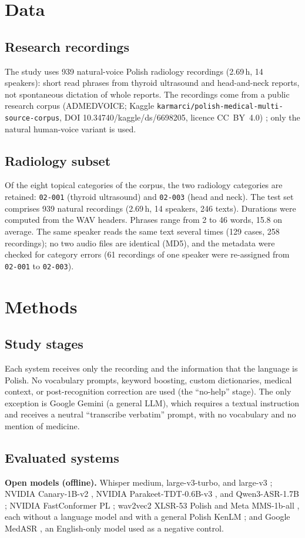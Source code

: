 \documentclass[conference]{IEEEtran}
\begin{document}
\section{Data}
\subsection{Research recordings}
The study uses 939 natural-voice Polish radiology recordings (2.69\,h, 14 speakers): short read phrases from thyroid ultrasound and head-and-neck reports, not spontaneous dictation of whole reports. The recordings come from a public research corpus (ADMEDVOICE; Kaggle \texttt{karmarci/polish-medical-multi-source-corpus}, DOI 10.34740/kaggle/ds/6698205, licence CC~BY~4.0) \cite{r1}; only the natural human-voice variant is used.

\subsection{Radiology subset}
Of the eight topical categories of the corpus, the two radiology categories are retained: \texttt{02-001} (thyroid ultrasound) and \texttt{02-003} (head and neck). The test set comprises 939 natural recordings (2.69\,h, 14 speakers, 246 texts). Durations were computed from the WAV headers. Phrases range from 2 to 46 words, 15.8 on average. The same speaker reads the same text several times (129 cases, 258 recordings); no two audio files are identical (MD5), and the metadata were checked for category errors (61 recordings of one speaker were re-assigned from \texttt{02-001} to \texttt{02-003}).

\section{Methods}
\subsection{Study stages}
Each system receives only the recording and the information that the language is Polish. No vocabulary prompts, keyword boosting, custom dictionaries, medical context, or post-recognition correction are used (the ``no-help'' stage). The only exception is Google Gemini (a general LLM), which requires a textual instruction and receives a neutral ``transcribe verbatim'' prompt, with no vocabulary and no mention of medicine.

\subsection{Evaluated systems}\label{sec:evaluated}
\noindent\textbf{Open models (offline).} Whisper medium, large-v3-turbo, and large-v3 \cite{r2}; NVIDIA Canary-1B-v2 \cite{r5}, NVIDIA Parakeet-TDT-0.6B-v3 \cite{r6}, and Qwen3-ASR-1.7B \cite{r8}; NVIDIA FastConformer PL \cite{r7}; wav2vec2 XLSR-53 Polish \cite{r3,r9} and Meta MMS-1b-all \cite{r4}, each without a language model and with a general Polish KenLM \cite{r20}; and Google MedASR \cite{r10}, an English-only model used as a negative control.
\end{document}
